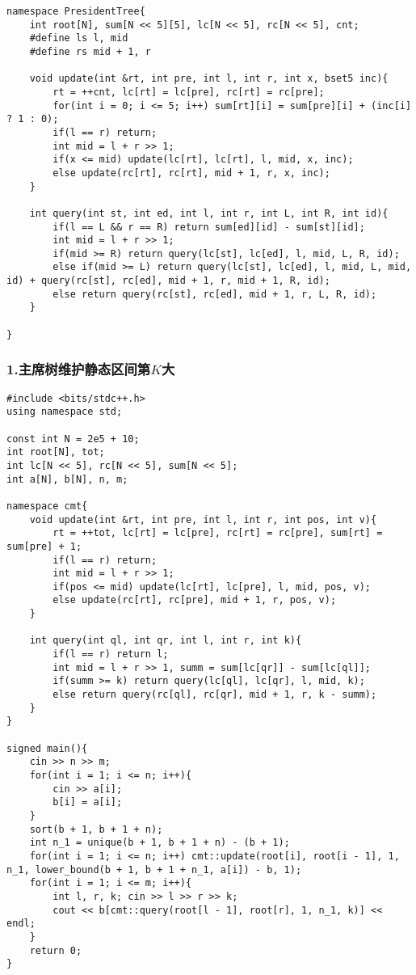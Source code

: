 \documentclass[]{article}
\begin{document}
\begin{verbatim}
namespace PresidentTree{
    int root[N], sum[N << 5][5], lc[N << 5], rc[N << 5], cnt;
    #define ls l, mid
    #define rs mid + 1, r

    void update(int &rt, int pre, int l, int r, int x, bset5 inc){
        rt = ++cnt, lc[rt] = lc[pre], rc[rt] = rc[pre];
        for(int i = 0; i <= 5; i++) sum[rt][i] = sum[pre][i] + (inc[i] ? 1 : 0);
        if(l == r) return;
        int mid = l + r >> 1;
        if(x <= mid) update(lc[rt], lc[rt], l, mid, x, inc);
        else update(rc[rt], rc[rt], mid + 1, r, x, inc);
    }

    int query(int st, int ed, int l, int r, int L, int R, int id){
        if(l == L && r == R) return sum[ed][id] - sum[st][id];
        int mid = l + r >> 1;
        if(mid >= R) return query(lc[st], lc[ed], l, mid, L, R, id);
        else if(mid >= L) return query(lc[st], lc[ed], l, mid, L, mid, id) + query(rc[st], rc[ed], mid + 1, r, mid + 1, R, id);
        else return query(rc[st], rc[ed], mid + 1, r, L, R, id);
    }

}
\end{verbatim}

\hypertarget{ux4e3bux5e2dux6811ux7ef4ux62a4ux9759ux6001ux533aux95f4ux7b2ckux5927}{%
\subsubsection{\texorpdfstring{1.主席树维护静态区间第\(K\)大}{1.主席树维护静态区间第K大}}\label{ux4e3bux5e2dux6811ux7ef4ux62a4ux9759ux6001ux533aux95f4ux7b2ckux5927}}

\begin{verbatim}
#include <bits/stdc++.h>
using namespace std;

const int N = 2e5 + 10;
int root[N], tot;
int lc[N << 5], rc[N << 5], sum[N << 5];
int a[N], b[N], n, m;

namespace cmt{
    void update(int &rt, int pre, int l, int r, int pos, int v){
        rt = ++tot, lc[rt] = lc[pre], rc[rt] = rc[pre], sum[rt] = sum[pre] + 1;
        if(l == r) return;
        int mid = l + r >> 1;
        if(pos <= mid) update(lc[rt], lc[pre], l, mid, pos, v);
        else update(rc[rt], rc[pre], mid + 1, r, pos, v);
    }

    int query(int ql, int qr, int l, int r, int k){
        if(l == r) return l;
        int mid = l + r >> 1, summ = sum[lc[qr]] - sum[lc[ql]];
        if(summ >= k) return query(lc[ql], lc[qr], l, mid, k);
        else return query(rc[ql], rc[qr], mid + 1, r, k - summ);
    }
}

signed main(){
    cin >> n >> m;
    for(int i = 1; i <= n; i++){
        cin >> a[i]; 
        b[i] = a[i];
    }
    sort(b + 1, b + 1 + n);
    int n_1 = unique(b + 1, b + 1 + n) - (b + 1);
    for(int i = 1; i <= n; i++) cmt::update(root[i], root[i - 1], 1, n_1, lower_bound(b + 1, b + 1 + n_1, a[i]) - b, 1);
    for(int i = 1; i <= m; i++){
        int l, r, k; cin >> l >> r >> k;
        cout << b[cmt::query(root[l - 1], root[r], 1, n_1, k)] << endl;
    }
    return 0;
}
\end{verbatim}
\end{document}
